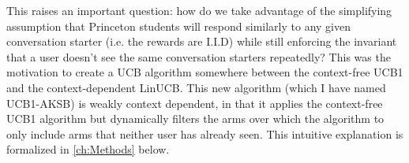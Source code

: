 This raises an important question: how do we take advantage of the simplifying assumption that Princeton students will respond similarly to any given conversation starter (i.e. the rewards are I.I.D) while still enforcing the invariant that a user doesn't see the same conversation starters repeatedly? This was the motivation to create a UCB algorithm somewhere between the context-free UCB1 and the context-dependent LinUCB. This new algorithm (which I have named UCB1-AKSB) is weakly context dependent, in that it applies the context-free UCB1 algorithm but dynamically filters the arms over which the algorithm to only include arms that neither user has already seen. This intuitive explanation is formalized in \ref{ch:Methods} below.
